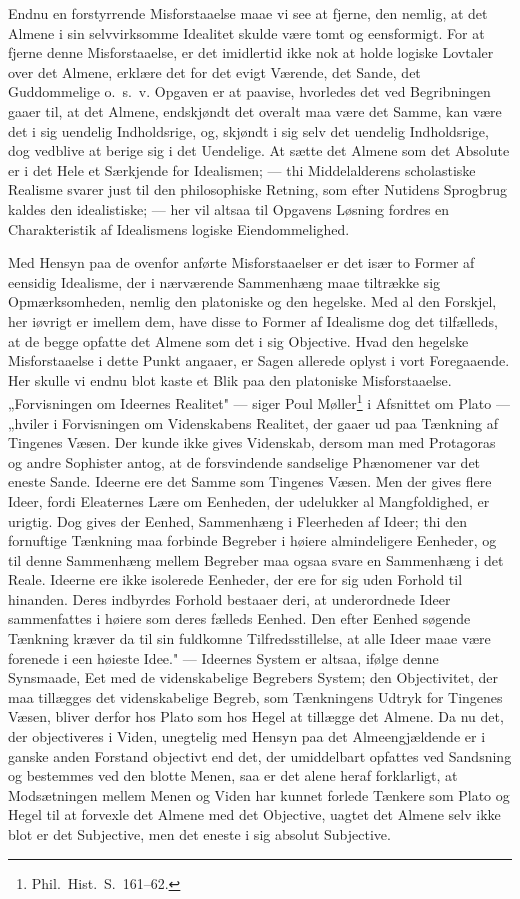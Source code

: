 \documentclass[12pt]{book}
\newcommand{\opage}[1]{\marginnote{\footnotesize\textit{[#1]}}}
\begin{document}
Endnu en forstyrrende Misforstaaelse maae vi see at fjerne, den nemlig, at det Almene i sin
selvvirksomme Idealitet skulde være tomt og eensformigt. For at fjerne denne Misforstaaelse, er
det imidlertid ikke nok at holde logiske Lovtaler over det Almene, erklære det for det evigt
Værende, det Sande, det Guddommelige o.\ s.\ v. Opgaven er at paavise, hvorledes det ved
Begribningen gaaer til, at det Almene, endskjøndt det overalt maa være det Samme, kan være det i
sig uendelig Indholdsrige, og, skjøndt i sig selv det uendelig Indholdsrige, dog vedblive at
berige sig i det Uendelige. At sætte det Almene som det Absolute er i det Hele et Særkjende for
Idealismen; --- thi Middelalderens scholastiske Realisme svarer just til den philosophiske
Retning, som efter
\opage{180} Nutidens Sprogbrug kaldes den idealistiske; --- her vil altsaa til Opgavens Løsning fordres en
Charakteristik af Idealismens logiske Eiendommelighed.

Med Hensyn paa de ovenfor anførte Misforstaaelser er det især to Former af eensidig Idealisme,
der i nærværende Sammenhæng maae tiltrække sig Opmærksomheden, nemlig den platoniske og den
hegelske. Med al den Forskjel, her iøvrigt er imellem dem, have disse to Former af Idealisme dog
det tilfælleds, at de begge opfatte det Almene som det i sig Objective. Hvad den hegelske
Misforstaaelse i dette Punkt angaaer, er Sagen allerede oplyst i vort Foregaaende. Her skulle vi
endnu blot kaste et Blik paa den platoniske Misforstaaelse. „Forvisningen om Ideernes Realitet"
--- siger Poul Møller\footnote{Phil.\ Hist.\ S.~161--62.} i Afsnittet om Plato --- „hviler i
Forvisningen om Videnskabens Realitet, der gaaer ud paa Tænkning af Tingenes Væsen. Der kunde
ikke gives Videnskab, dersom man med Protagoras og andre Sophister antog, at de forsvindende
sandselige Phænomener var det eneste Sande. Ideerne ere det Samme som Tingenes Væsen. Men der
gives flere Ideer, fordi Eleaternes Lære om Eenheden, der udelukker al Mangfoldighed, er urigtig.
Dog gives der Eenhed, Sammenhæng i Fleerheden af Ideer; thi den fornuftige Tænkning maa forbinde
Begreber i høiere almindeligere Eenheder, og til denne Sammenhæng mellem Begreber maa ogsaa svare
en Sammenhæng i det Reale. Ideerne ere ikke isolerede Eenheder, der ere for sig uden Forhold til
hinanden. Deres indbyrdes Forhold bestaaer deri, at underordnede Ideer sammenfattes i høiere som
deres fælleds Eenhed. Den efter Eenhed søgende Tænkning kræver da til sin fuldkomne
Tilfredsstillelse, at alle Ideer maae være forenede i een høieste Idee." --- Ideernes System er
altsaa, ifølge denne Synsmaade, Eet med de videnskabelige Begrebers System; den
\opage{181} Objectivitet, der maa tillægges det videnskabelige Begreb, som Tænkningens Udtryk for Tingenes
Væsen, bliver derfor hos Plato som hos Hegel at tillægge det Almene. Da nu det, der objectiveres
i Viden, unegtelig med Hensyn paa det Almeengjældende er i ganske anden Forstand objectivt end
det, der umiddelbart opfattes ved Sandsning og bestemmes ved den blotte Menen, saa er det alene
heraf forklarligt, at Modsætningen mellem Menen og Viden har kunnet forlede Tænkere som Plato og
Hegel til at forvexle det Almene med det Objective, uagtet det Almene selv ikke blot er det
Subjective, men det eneste i sig absolut Subjective.
\end{document}
